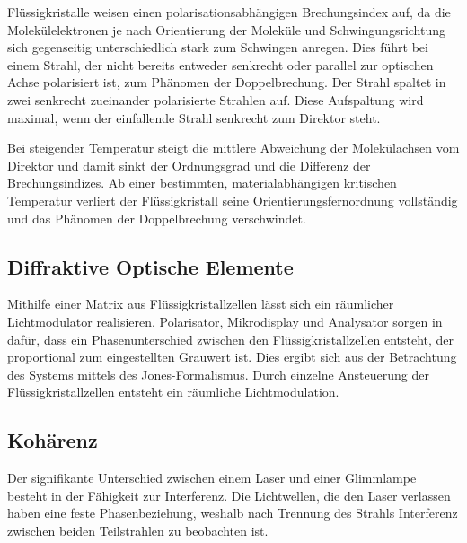 \documentclass[
	a4paper,
	12pt,
	pagesize,
	ngerman
]{scrartcl}
\begin{document}
	Flüssigkristalle weisen einen polarisationsabhängigen Brechungsindex auf, da die Molekülelektronen je nach Orientierung der Moleküle und Schwingungsrichtung sich gegenseitig unterschiedlich stark zum Schwingen anregen.
	Dies führt bei einem Strahl, der nicht bereits entweder senkrecht oder parallel zur optischen Achse polarisiert ist, zum Phänomen der Doppelbrechung.
	Der Strahl spaltet in zwei senkrecht zueinander polarisierte Strahlen auf.
	Diese Aufspaltung wird maximal, wenn der einfallende Strahl senkrecht zum Direktor steht.

	Bei steigender Temperatur steigt die mittlere Abweichung der Molekülachsen vom Direktor und damit sinkt der Ordnungsgrad und die Differenz der Brechungsindizes.
	Ab einer bestimmten, materialabhängigen kritischen Temperatur verliert der Flüssigkristall seine Orientierungsfernordnung vollständig und das Phänomen der Doppelbrechung verschwindet.


	\subsection{Diffraktive Optische Elemente} %

	Mithilfe einer Matrix aus Flüssigkristallzellen lässt sich ein räumlicher Lichtmodulator realisieren.
	Polarisator, Mikrodisplay und Analysator sorgen in dafür, dass ein Phasenunterschied zwischen den Flüssigkristallzellen entsteht, der proportional zum eingestellten Grauwert ist.
	Dies ergibt sich aus der Betrachtung des Systems mittels des Jones-Formalismus.
	Durch einzelne Ansteuerung der Flüssigkristallzellen entsteht ein räumliche Lichtmodulation.


	\subsection{Kohärenz}
	Der signifikante Unterschied zwischen einem Laser und einer Glimmlampe besteht in der Fähigkeit zur Interferenz.
	Die Lichtwellen, die den Laser verlassen haben eine feste Phasenbeziehung, weshalb nach Trennung des Strahls Interferenz zwischen beiden Teilstrahlen zu beobachten ist.
\end{document}
